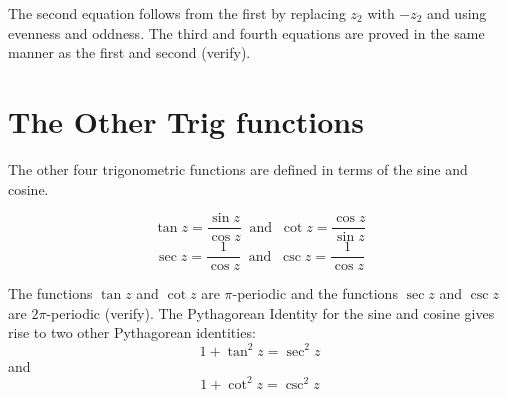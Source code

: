 \documentclass[handout]{ximera}
\begin{document}


The second equation follows from the first by replacing $z_2$ with $-z_2$ and using evenness and oddness.
The third and fourth equations are proved in the same manner as the first and second (verify).


\section{The Other Trig functions}
The other four trigonometric functions are defined in terms of the sine and cosine.

\begin{definition}
\[
\tan z = \frac{\sin z}{\cos z} \;\; \mbox{and} \;\; \cot z = \frac{\cos z}{\sin z}
\]
\[
\sec z = \frac{1}{\cos z} \;\; \mbox{and} \;\; \csc z = \frac{1}{\cos z}
\]
\end{definition}
The functions $\tan z$ and $\cot z$ are $\pi$-periodic
and the functions $\sec z$ and $\csc z$ are $2\pi$-periodic (verify).
The Pythagorean Identity for the sine and cosine gives rise to two other Pythagorean identities:
\[
1+ \tan^2 z = \sec^2 z
\]
and
\[
1 + \cot^2 z = \csc^2 z
\]
\end{document}
